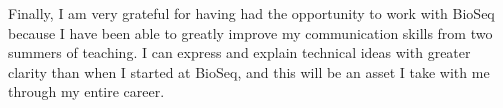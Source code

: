 \documentclass{report}
\begin{document}
Finally, I am very grateful for having had the opportunity to work with BioSeq because I have been able to greatly improve my communication skills from two summers of teaching. I can express and explain technical ideas with greater clarity than when I started at BioSeq, and this will be an asset I take with me through my entire career. 



\end{document}
